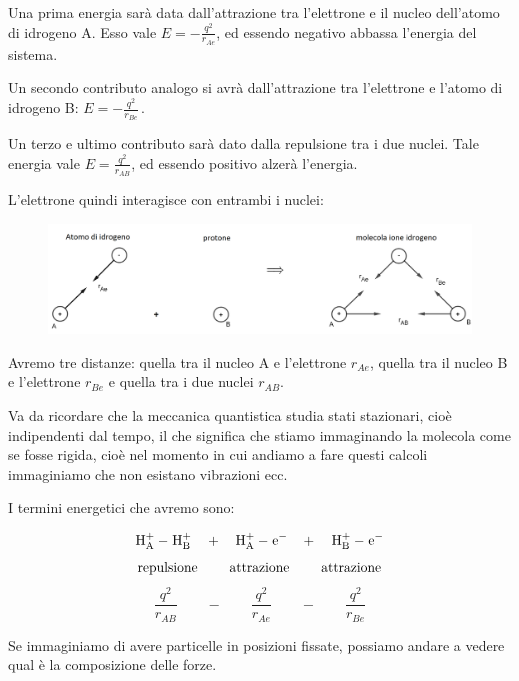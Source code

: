 Una prima energia sarà data dall'attrazione tra l'elettrone e il nucleo dell'atomo di idrogeno A. Esso vale $E=-\frac{q^2}{r_{Ae}}$, ed essendo negativo abbassa l'energia del sistema.

Un secondo contributo analogo si avrà dall'attrazione tra l'elettrone e l'atomo di idrogeno B: $E=-\frac{q^2}{r_{Be}}$\,.

Un terzo e ultimo contributo sarà dato dalla repulsione tra i due nuclei. Tale energia vale $E=\frac{q^2}{r_{AB}}$, ed essendo positivo alzerà l'energia.

\vspace{0.2cm}L'elettrone quindi interagisce con entrambi i nuclei:
\begin{figure}[htp]
    \centering
    \includegraphics[width=14cm]{immagini/interazione_elettrone_con_protoni.png}
\end{figure}

Avremo tre distanze: quella tra il nucleo A e l'elettrone $r_{Ae}$, quella tra il nucleo B e l'elettrone $r_{Be}$ e quella tra i due nuclei $r_{AB}$.

Va da ricordare che la meccanica quantistica studia stati stazionari, cioè indipendenti dal tempo, il che significa che stiamo immaginando la molecola come se fosse rigida, cioè nel momento in cui andiamo a fare questi calcoli immaginiamo che non esistano vibrazioni ecc.

I termini energetici che avremo sono:
\newpage

$$\rm H_A^+ - \hspace{0.2mm} H_B^+ \quad + \quad H_A^+ - \hspace{0.2mm} e^- \quad \hspace{-0.2mm}+\hspace{0.2mm} \quad H_B^+ - \hspace{0.2mm}e^-$$
$$\text{repulsione \qquad attrazione \qquad attrazione}$$
$$\frac{q^2}{r_{AB}} \qquad - \qquad \frac{q^2}{r_{Ae}} \qquad - \qquad \frac{q^2}{r_{Be}}$$

Se immaginiamo di avere particelle in posizioni fissate, possiamo andare a vedere qual è la composizione delle forze.

